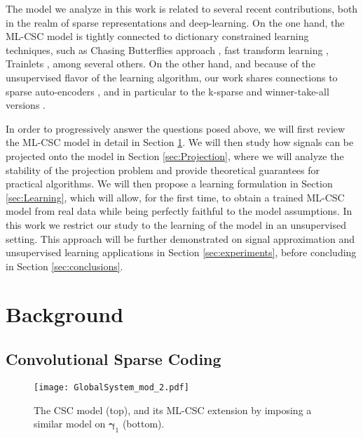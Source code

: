 \documentclass[10pt,journal]{IEEEtran}
\def\x{{\mathbf x}}
\def\gama{{\boldsymbol \gamma}}
\theoremstyle{plain}
\theoremstyle{definition}
\begin{document}
The model we analyze in this work is related to several recent contributions, both in the realm of sparse representations and deep-learning. On the one hand, the ML-CSC model is tightly connected to dictionary constrained learning techniques, such as Chasing Butterflies approach \cite{Lemagoarou15}, fast transform learning \cite{Chabiron2013}, Trainlets \cite{Sulam2016}, among several others. On the other hand, and because of the unsupervised flavor of the learning algorithm, our work shares connections to sparse auto-encoders \cite{ng2011sparse}, and in particular to the k-sparse \cite{makhzani2013k} and winner-take-all versions \cite{makhzani2015winner}.

In order to progressively answer the questions posed above, we will first review the ML-CSC model in detail in Section \ref{sec:Background}. We will then study how signals can be projected onto the model in Section \ref{sec:Projection}, where we will analyze the stability of the projection problem and provide theoretical guarantees for practical algorithms. We will then propose a learning formulation in Section \ref{sec:Learning}, which will allow, for the first time, to obtain a trained ML-CSC model from real data while being perfectly faithful to the model assumptions. In this work we restrict our study to the learning of the model in an unsupervised setting. This approach will be further demonstrated on signal approximation and unsupervised learning applications in Section \ref{sec:experiments}, before concluding in Section \ref{sec:conclusions}.


\section{Background}
\label{sec:Background}

\subsection{Convolutional Sparse Coding}

\begin{figure}
\begin{center}
	\texttt{[image: GlobalSystem\_mod\_2.pdf]}
	\caption{The CSC model (top), and its ML-CSC extension by imposing a similar model on $\gama_1$ (bottom). %
	}
	\label{Fig:ML-CSCmodel}
\end{center}
\end{figure}
\end{document}
